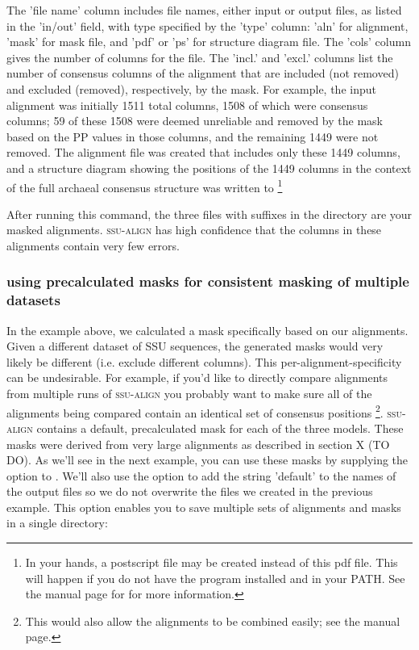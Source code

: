 The 'file name' column includes file names, either input or output
files, as listed in the 'in/out' field, with type specified by the
'type' column: 'aln' for alignment, 'mask' for mask file, and 'pdf' or
'ps' for structure diagram file. The 'cols' column gives the number of
columns for the file. The 'incl.' and 'excl.' columns list the number
of consensus columns of the alignment that are included (not removed)
and excluded (removed), respectively, by the mask. For example, the
 input alignment was initially 1511 total columns,
1508 of which were consensus columns; 59 of these 1508 were deemed
unreliable and removed by the mask based on the PP values in those
columns, and the remaining 1449 were not removed. The alignment file
 was created that includes only these 1449
columns, and a structure diagram showing the positions of the 1449
columns in the context of the full archaeal consensus structure was
written to  \footnote{In your hands, a
postscript file  may be created instead
of this pdf file. This will happen if you do not have the
 program installed and in your PATH. See the manual
page for  for more information.}

After running this command, the three files with 
suffixes in the  directory are your masked
alignments. \textsc{ssu-align} has high confidence that the columns in
these alignments contain very few errors. 

\subsubsection{using precalculated masks for consistent masking of
  multiple datasets}

In the  example above, we calculated a mask
specifically based on our  alignments. Given a different
dataset of SSU sequences, the generated masks would very likely be
different (i.e. exclude different columns). This
per-alignment-specificity can be undesirable. For example, if you'd
like to directly compare alignments from multiple runs of
\textsc{ssu-align} you probably want to make sure all of the
alignments being compared contain an identical set of consensus
positions \footnote{This would also allow the alignments to be combined
easily; see the  manual page.}. \textsc{ssu-align}
contains a default, precalculated mask for each of the three
models. These masks were derived from very large alignments as
described in section X (TO DO). As we'll see in the next example, you
can use these masks by supplying the  option to
. We'll also use the  option to add the
string 'default' to the names of the output files so we do not
overwrite the files we created in the previous example. This option
enables you to save multiple sets of alignments and masks in a single
directory:

